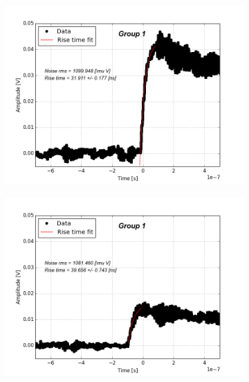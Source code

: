 \documentclass[12pt]{article}
\begin{document}
\begin{figure}[t!]
  \centering
  \begin{subfigure}[t]{0.45\textwidth}
    \centering
    \includegraphics[width=1.2\textwidth]{./graphics/data_6.png}
  \end{subfigure}
  \hfill
  \begin{subfigure}[t]{0.45\textwidth}
    \centering
    \includegraphics[width=1.2\textwidth]{./graphics/data_7.png}
  \end{subfigure}
  \hfill
  \begin{subfigure}[t]{0.45\textwidth}
    \centering

\end{subfigure}
\end{figure}
\end{document}
